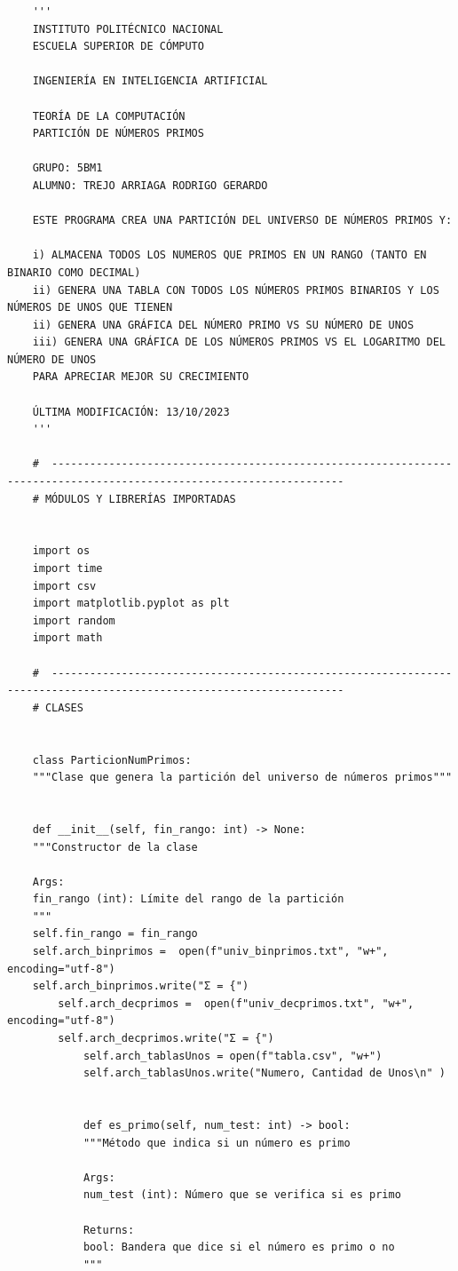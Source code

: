\documentclass[11pt]{article} %
\begin{document}
	\begin{lstlisting}
	'''
	INSTITUTO POLITÉCNICO NACIONAL
	ESCUELA SUPERIOR DE CÓMPUTO
	
	INGENIERÍA EN INTELIGENCIA ARTIFICIAL
	
	TEORÍA DE LA COMPUTACIÓN
	PARTICIÓN DE NÚMEROS PRIMOS
	
	GRUPO: 5BM1
	ALUMNO: TREJO ARRIAGA RODRIGO GERARDO
	
	ESTE PROGRAMA CREA UNA PARTICIÓN DEL UNIVERSO DE NÚMEROS PRIMOS Y:
	
	i) ALMACENA TODOS LOS NUMEROS QUE PRIMOS EN UN RANGO (TANTO EN BINARIO COMO DECIMAL)
	ii) GENERA UNA TABLA CON TODOS LOS NÚMEROS PRIMOS BINARIOS Y LOS NÚMEROS DE UNOS QUE TIENEN
	ii) GENERA UNA GRÁFICA DEL NÚMERO PRIMO VS SU NÚMERO DE UNOS 
	iii) GENERA UNA GRÁFICA DE LOS NÚMEROS PRIMOS VS EL LOGARITMO DEL NÚMERO DE UNOS
	PARA APRECIAR MEJOR SU CRECIMIENTO
	
	ÚLTIMA MODIFICACIÓN: 13/10/2023
	'''
	
	#  --------------------------------------------------------------------------------------------------------------------
	# MÓDULOS Y LIBRERÍAS IMPORTADAS
	
	
	import os
	import time
	import csv
	import matplotlib.pyplot as plt
	import random
	import math
	
	#  --------------------------------------------------------------------------------------------------------------------
	# CLASES
	
	
	class ParticionNumPrimos:
	"""Clase que genera la partición del universo de números primos"""
	
	
	def __init__(self, fin_rango: int) -> None:
	"""Constructor de la clase
	
	Args:
	fin_rango (int): Límite del rango de la partición
	"""
	self.fin_rango = fin_rango 
	self.arch_binprimos =  open(f"univ_binprimos.txt", "w+", encoding="utf-8") 
	self.arch_binprimos.write("Σ = {")
		self.arch_decprimos =  open(f"univ_decprimos.txt", "w+", encoding="utf-8")
		self.arch_decprimos.write("Σ = {")  
			self.arch_tablasUnos = open(f"tabla.csv", "w+")
			self.arch_tablasUnos.write("Numero, Cantidad de Unos\n" )  
			
			
			def es_primo(self, num_test: int) -> bool:
			"""Método que indica si un número es primo
			
			Args:
			num_test (int): Número que se verifica si es primo
			
			Returns:
			bool: Bandera que dice si el número es primo o no
			"""
			

\end{lstlisting}
\end{document}
